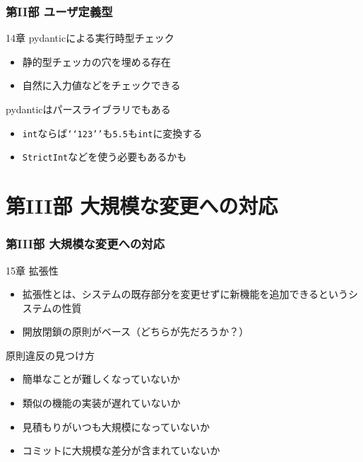 \documentclass[aspectratio=169,dvipdfmx,14pt,notheorems]{beamer}
\theoremstyle{definition}
\begin{document}
\begin{frame}\frametitle{第II部 ユーザ定義型}

\begin{block}{14章 pydanticによる実行時型チェック}
\begin{itemize}
\item 静的型チェッカの穴を埋める存在
\item 自然に入力値などをチェックできる
\end{itemize}
\end{block}

\begin{alertblock}{pydanticはパースライブラリでもある}
\begin{itemize}
\item \texttt{int}ならば\texttt{\lq\lq{}123\rq\rq{}}も\texttt{5.5}も\texttt{int}に変換する
\item \texttt{StrictInt}などを使う必要もあるかも
\end{itemize}
\end{alertblock}

\end{frame}

\section{第III部 大規模な変更への対応}

\begin{frame}\frametitle{第III部 大規模な変更への対応}

\begin{block}{15章 拡張性}
\begin{itemize}
\item 拡張性とは、システムの既存部分を変更せずに新機能を追加できるというシステムの性質
\item 開放閉鎖の原則がベース（どちらが先だろうか？）
\end{itemize}
\end{block}

\begin{alertblock}{原則違反の見つけ方}
\begin{itemize}
\item 簡単なことが難しくなっていないか
\item 類似の機能の実装が遅れていないか
\item 見積もりがいつも大規模になっていないか
\item コミットに大規模な差分が含まれていないか
\end{itemize}
\end{alertblock}

\end{frame}
\end{document}
